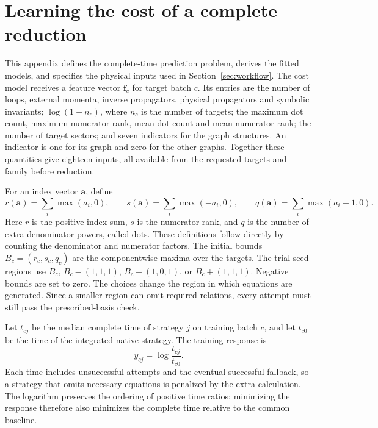 \section{Learning the cost of a complete reduction}
\label{app:workflow}
This appendix defines the complete-time prediction problem, derives the fitted models, and specifies the physical inputs used in Section~\ref{sec:workflow}. The cost model receives a feature vector $\boldsymbol f_c$ for target batch $c$.
Its entries are the number of loops, external momenta, inverse propagators,
physical propagators and symbolic invariants; $\log(1+n_c)$, where $n_c$ is
the number of targets; the maximum dot count, maximum numerator rank, mean dot count and mean numerator rank;
the number of target sectors; and seven indicators for the graph structures.
An indicator is one for its graph and zero for the other graphs.
Together these quantities give eighteen inputs, all available from the requested targets and family before reduction.

For an index vector $\boldsymbol a$, define
\begin{equation}
 r(\boldsymbol a)=\sum_i\max(a_i,0),\qquad
 s(\boldsymbol a)=\sum_i\max(-a_i,0),\qquad
 q(\boldsymbol a)=\sum_i\max(a_i-1,0).
\end{equation}
Here $r$ is the positive index sum, $s$ is the numerator rank, and $q$ is
the number of extra denominator powers, called dots. These definitions
follow directly by counting the denominator and numerator factors.
The initial bounds $B_c=(r_c,s_c,q_c)$ are the componentwise maxima over
the targets. The trial seed regions use $B_c$, $B_c-(1,1,1)$,
$B_c-(1,0,1)$, or $B_c+(1,1,1)$. Negative bounds are set to zero.
The choices change the region in which equations are generated. Since a smaller region can omit required relations, every attempt must still pass the prescribed-basis check.

Let $t_{cj}$ be the median complete time of strategy $j$ on training batch
$c$, and let $t_{c0}$ be the time of the integrated native strategy.
The training response is
\begin{equation}
 y_{cj}=\log\frac{t_{cj}}{t_{c0}}.
 \label{eq:workflow-label}
\end{equation}
Each time includes unsuccessful attempts and the eventual successful fallback, so a strategy that omits necessary equations is penalized by the extra calculation. The logarithm preserves the ordering of positive time ratios; minimizing the response therefore also minimizes the complete time relative to the common baseline.

